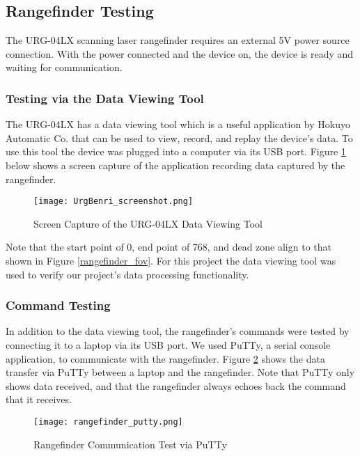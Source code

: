 \subsection{Rangefinder Testing}
The URG-04LX scanning laser rangefinder requires an external 5V power source connection. With the power connected and the device on, the device is ready and waiting for communication.

\subsubsection{Testing via the Data Viewing Tool}
The URG-04LX has a data viewing tool which is a useful application by Hokuyo Automatic Co. that can be used to view, record, and replay the device's data. To use this tool the device was plugged into a computer via its USB port. Figure \ref{URGBenriStandard_pic} below shows a screen capture of the application recording data captured by the rangefinder.

\begin{figure}[H]
	\centerline{\texttt{[image: UrgBenri\_screenshot.png]}}
	\caption{Screen Capture of the URG-04LX Data Viewing Tool \cite{URGBenriStandard_ref}}
	\label{URGBenriStandard_pic}
\end{figure}

Note that the start point of 0, end point of 768, and dead zone align to that shown in Figure \ref{rangefinder_fov}. For this project the data viewing tool was used to verify our project's data processing functionality.

\subsubsection{Command Testing}
In addition to the data viewing tool, the rangefinder's commands were tested by connecting it to a laptop via its USB port. We used PuTTy, a serial console application, to communicate with the rangefinder. Figure \ref{rangefinder_putty} shows the data transfer via PuTTy between a laptop and the rangefinder. Note that PuTTy only shows data received, and that the rangefinder always echoes back the command that it receives.

\begin{figure}[H]
	\centerline{\texttt{[image: rangefinder\_putty.png]}}
	\caption{Rangefinder Communication Test via PuTTy}
	\label{rangefinder_putty}
\end{figure}

